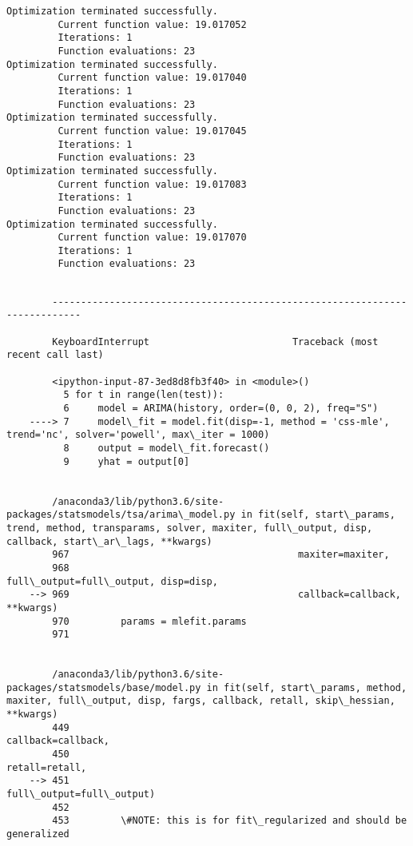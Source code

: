 \documentclass[11pt]{article}
\begin{document}
\begin{Verbatim}[commandchars=\\\{\}]
Optimization terminated successfully.
         Current function value: 19.017052
         Iterations: 1
         Function evaluations: 23
Optimization terminated successfully.
         Current function value: 19.017040
         Iterations: 1
         Function evaluations: 23
Optimization terminated successfully.
         Current function value: 19.017045
         Iterations: 1
         Function evaluations: 23
Optimization terminated successfully.
         Current function value: 19.017083
         Iterations: 1
         Function evaluations: 23
Optimization terminated successfully.
         Current function value: 19.017070
         Iterations: 1
         Function evaluations: 23

    \end{Verbatim}

    \begin{Verbatim}[commandchars=\\\{\}]

        ---------------------------------------------------------------------------

        KeyboardInterrupt                         Traceback (most recent call last)

        <ipython-input-87-3ed8d8fb3f40> in <module>()
          5 for t in range(len(test)):
          6     model = ARIMA(history, order=(0, 0, 2), freq="S")
    ----> 7     model\_fit = model.fit(disp=-1, method = 'css-mle', trend='nc', solver='powell', max\_iter = 1000)
          8     output = model\_fit.forecast()
          9     yhat = output[0]


        /anaconda3/lib/python3.6/site-packages/statsmodels/tsa/arima\_model.py in fit(self, start\_params, trend, method, transparams, solver, maxiter, full\_output, disp, callback, start\_ar\_lags, **kwargs)
        967                                        maxiter=maxiter,
        968                                        full\_output=full\_output, disp=disp,
    --> 969                                        callback=callback, **kwargs)
        970         params = mlefit.params
        971 


        /anaconda3/lib/python3.6/site-packages/statsmodels/base/model.py in fit(self, start\_params, method, maxiter, full\_output, disp, fargs, callback, retall, skip\_hessian, **kwargs)
        449                                                        callback=callback,
        450                                                        retall=retall,
    --> 451                                                        full\_output=full\_output)
        452 
        453         \#NOTE: this is for fit\_regularized and should be generalized



\end{Verbatim}
\end{document}
